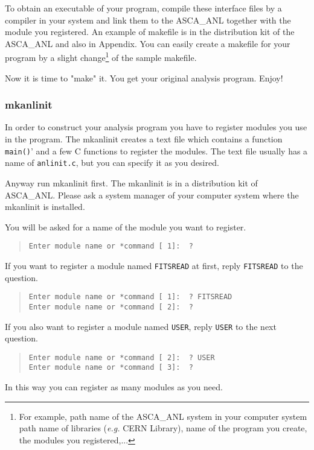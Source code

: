 To obtain an executable of your program,
compile these interface files by a compiler in your system
and link them to the ASCA\_ANL together with the module you registered.
An example of makefile is in the distribution kit of the ASCA\_ANL
and also in Appendix.
You can easily create a makefile for your program
by a slight change\footnote{
For example,
path name of the ASCA\_ANL system in your computer system
path name of libraries ({\em e.g.} CERN Library),
name of the program you create,
the modules you registered,...
}
of the sample makefile.

Now it is time to "make" it.
You get your original analysis program.
Enjoy!

\subsubsection{mkanlinit}
In order to construct your analysis program
you have to register modules you use in the program.
The mkanlinit creates a text file
which contains a function {\tt main()}'
and a few C functions to register the modules.
The text file usually has a name of {\tt anlinit.c},
but you can specify it as you desired.

Anyway run mkanlinit first.
The mkanlinit is in a distribution kit of ASCA\_ANL.
Please ask a system manager of your computer system
where the mkanlinit is installed.

You will be asked for a name of the module you want to register.
%
\begin{quote}\baselineskip 3.2mm\begin{verbatim}
Enter module name or *command [ 1]:  ?
\end{verbatim}\end{quote}
%
If you want to register a module named {\tt FITSREAD} at first,
reply {\tt FITSREAD} to the question.
%
\begin{quote}\baselineskip 3.2mm\begin{verbatim}
Enter module name or *command [ 1]:  ? FITSREAD
Enter module name or *command [ 2]:  ?
\end{verbatim}\end{quote}
%
If you also want to register a module named {\tt USER},
reply {\tt USER} to the next question.
%
\begin{quote}\baselineskip 3.2mm\begin{verbatim}
Enter module name or *command [ 2]:  ? USER
Enter module name or *command [ 3]:  ?
\end{verbatim}\end{quote}
%
In this way you can register as many modules as you need.

